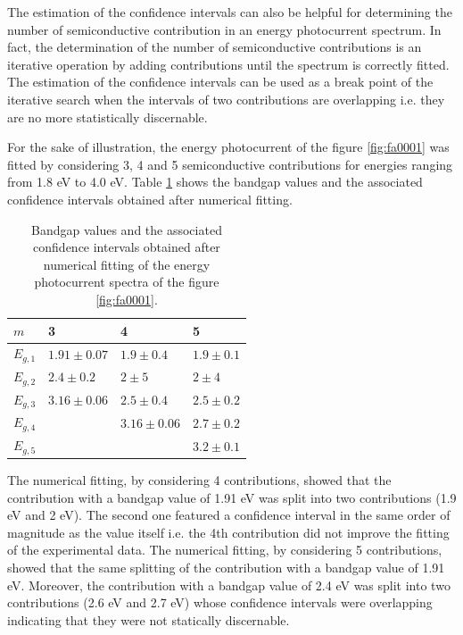 \documentclass[10pt, 3p, sort&compress]{elsarticle}
\begin{document}
 
The estimation of the confidence intervals can also be helpful for determining the number of semiconductive contribution in an energy photocurrent spectrum. In fact, the determination of the number of semiconductive contributions is an iterative operation by adding contributions until the spectrum is correctly fitted. The estimation of the confidence intervals can be used as a break point of the iterative search when the intervals of two contributions are overlapping i.e. they are no more statistically discernable. 

For the sake of illustration, the energy photocurrent of the figure \ref{fig:fa0001} was fitted by considering 3, 4 and 5 semiconductive contributions for energies ranging from 1.8 eV to 4.0 eV. Table \ref{table:result_noise_contributions} shows the bandgap values and the associated confidence intervals obtained after numerical fitting. 

\begin{table}[htpb]
\small
\begin{tabular}{ p{1cm}|p{2cm}|p{2cm}| p{2cm}}
\toprule
 $m$ & 3 & 4 &  5\\
\midrule
$E_{g,1}$ & $1.91 \pm 0.07$    & $1.9 \pm 0.4$      & $1.9 \pm 0.1$ \\
$E_{g,2}$ &  $2.4 \pm 0.2$      & $2 \pm 5$           & $2 \pm 4$\\
$E_{g,3}$ & $3.16 \pm 0.06$    & $2.5 \pm 0.4$     &  $2.5 \pm 0.2$\\
$E_{g,4}$ &                           &  $3.16 \pm 0.06$ &   $2.7 \pm 0.2$    \\
$E_{g,5}$ &                           &                         &    $3.2 \pm 0.1$     \\
 \bottomrule
\end{tabular}
\caption{Bandgap values and the associated confidence intervals obtained after numerical fitting of the energy photocurrent spectra of the figure \ref{fig:fa0001}.}
\label{table:result_noise_contributions}
\end{table}

The numerical fitting, by considering 4 contributions, showed that the contribution with a bandgap value of 1.91 
eV was split into two contributions (1.9 eV and 2 eV). The second one featured a confidence interval in the same 
order of magnitude as the value itself i.e. the 4th contribution did not improve the fitting of the experimental 
data. 
The numerical fitting, by considering 5 contributions, showed that the same splitting of the contribution with a 
bandgap value of 1.91 eV. Moreover, the contribution with a bandgap value of 2.4 eV was split into two 
contributions (2.6 eV and 2.7 eV) whose confidence intervals were overlapping indicating that they were not 
statically discernable.
\end{document}
